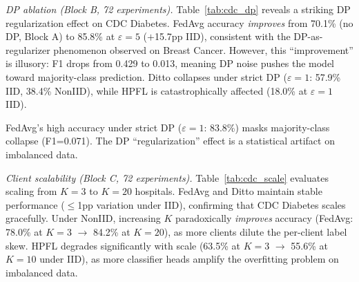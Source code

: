 \documentclass[conference,a4paper]{IEEEtran}
\begin{document}
\smallskip\noindent\textit{DP ablation (Block B, 72 experiments).} Table~\ref{tab:cdc_dp} reveals a striking DP regularization effect on CDC Diabetes. FedAvg accuracy \textit{improves} from 70.1\% (no DP, Block A) to 85.8\% at $\varepsilon{=}5$ ($+$15.7pp IID), consistent with the DP-as-regularizer phenomenon observed on Breast Cancer. However, this ``improvement'' is illusory: F1 drops from 0.429 to 0.013, meaning DP noise pushes the model toward majority-class prediction. Ditto collapses under strict DP ($\varepsilon{=}1$: 57.9\% IID, 38.4\% NonIID), while HPFL is catastrophically affected (18.0\% at $\varepsilon{=}1$ IID).

\begin{table}[htbp]
\centering
\caption{CDC Diabetes: DP Ablation (Block B, 72 exp.). $K{=}5$, IID and NonIID. Mean $\pm$ std over 3 seeds. Acc (\%) / F1.}
\label{tab:cdc_dp}
\par{\footnotesize FedAvg's high accuracy under strict DP ($\varepsilon{=}1$: 83.8\%) masks majority-class collapse (F1=0.071). The DP ``regularization'' effect is a statistical artifact on imbalanced data.}
\end{table}

\smallskip\noindent\textit{Client scalability (Block C, 72 experiments).} Table~\ref{tab:cdc_scale} evaluates scaling from $K{=}3$ to $K{=}20$ hospitals. FedAvg and Ditto maintain stable performance ($\leq$1pp variation under IID), confirming that CDC Diabetes scales gracefully. Under NonIID, increasing $K$ paradoxically \textit{improves} accuracy (FedAvg: 78.0\% at $K{=}3$ $\to$ 84.2\% at $K{=}20$), as more clients dilute the per-client label skew. HPFL degrades significantly with scale (63.5\% at $K{=}3$ $\to$ 55.6\% at $K{=}10$ under IID), as more classifier heads amplify the overfitting problem on imbalanced data.
\end{document}

